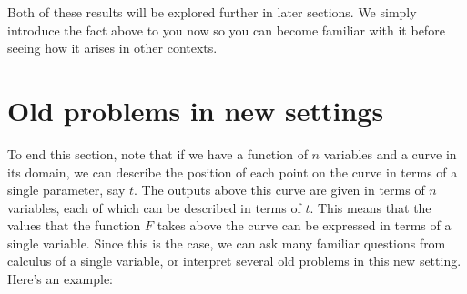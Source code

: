 \documentclass{ximera}
\begin{document}
Both of these results will be explored further in later sections.  We simply introduce the fact above to you now so you can become familiar with it before seeing how it arises in other contexts.

\section{Old problems in new settings}
To end this section, note that if we have a function of $n$ variables and a curve in its domain, we can describe the position of each point on the curve in terms of a single parameter, say $t$.  The outputs above this curve are given in terms of $n$ variables, each of which can be described in terms of $t$.  This means that the values that the function $F$ takes above the curve can be expressed in terms of a single variable.  Since this is the case, we can ask many familiar questions from calculus of a single variable, or interpret several old problems in this new setting.  Here's an example:
\end{document}
